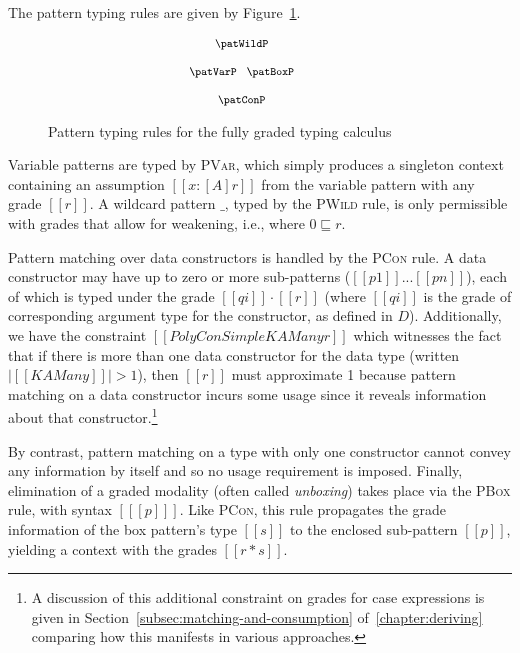 The pattern typing rules are given by
Figure~\ref{fig:pat-typing}.

\begin{figure}[t]
    \begin{align*}
      {\footnotesize{
    \hspace{-3em}\begin{array}{c}
    \patWildP
    \\[1.25em]
    \patVarP
    \;\;\;
    \patBoxP
    \\[1.25em]
    \patConP
    \end{array}
      }}
    \end{align*}
      \caption{Pattern typing rules for the fully graded typing calculus}
    \label{fig:pat-typing}
\end{figure}

Variable patterns are typed by \textsc{PVar}, which simply produces a singleton
context containing an assumption $[[ x : [A] r]]$ from the variable pattern with
any grade $[[ r ]]$. A wildcard pattern $\_$, typed by the \textsc{PWild} rule,
is only permissible with grades that allow for weakening, i.e., where $0
\sqsubseteq r$. 

Pattern matching over data constructors is handled by the
\textsc{PCon} rule. A data constructor may have up to zero or more sub-patterns
($[[ p1 ]] ... [[ pn ]]$), each of which is typed under the grade $[[ qi ]]
\cdot [[ r ]]$ (where $[[ qi ]]$ is the grade of corresponding argument type for
the constructor, as defined in $D$). Additionally, we have the constraint
$[[{PolyConSimple {K {A Many}} r}]]$ which witnesses the fact that if there is
more than one data constructor for the data type (written $|[[ K {A Many} ]]| >
1$), then $[[ r ]]$ must approximate 1 because pattern matching on a data
constructor incurs some usage since it reveals information about that
constructor.\footnote{A discussion of this additional constraint on grades for
case expressions is given in Section~\ref{subsec:matching-and-consumption}
of~\ref{chapter:deriving} comparing how this manifests in various approaches.}

By contrast, pattern matching on a type with only one constructor cannot convey
any information by itself and so no usage requirement is imposed. Finally,
elimination of a graded modality (often called \textit{unboxing}) takes place
via the \textsc{PBox} rule, with syntax $[[ [p] ]]$. Like \textsc{PCon}, this
rule propagates the grade information of the box pattern's type $[[s]]$ to the
enclosed sub-pattern $[[ p ]]$, yielding a context with the grades $[[r * s]]$.

